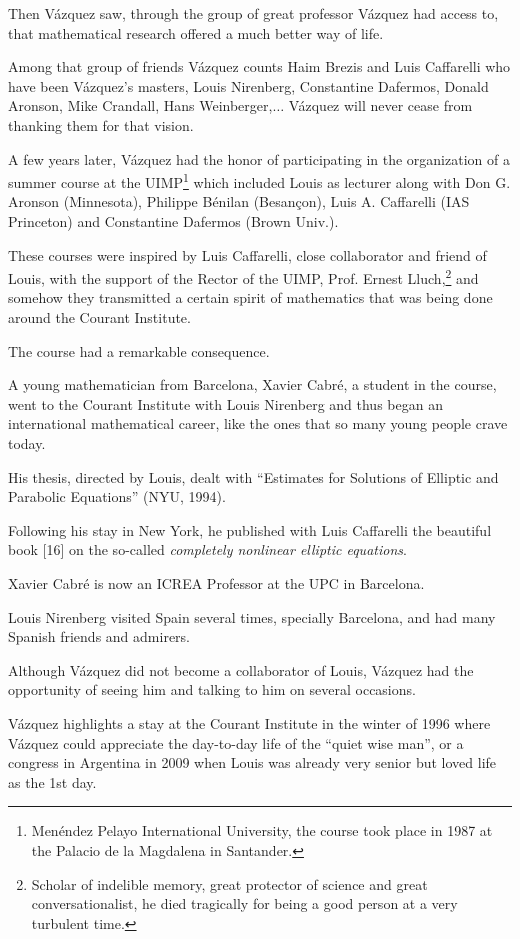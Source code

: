 \documentclass{article}
\begin{document}
Then V\'azquez saw, through the group of great professor V\'azquez had access to, that mathematical research offered a much better way of life.

Among that group of friends V\'azquez counts Haim Brezis and Luis Caffarelli who have been V\'azquez's masters, Louis Nirenberg, Constantine Dafermos, Donald Aronson, Mike Crandall, Hans Weinberger,$\ldots$ V\'azquez will never cease from thanking them for that vision.

%
A few years later, V\'azquez had the honor of participating in the organization of a summer course at the UIMP\footnote{Men\'endez Pelayo International University, the course took place in 1987 at the Palacio de la Magdalena in Santander.} which included Louis as lecturer along with Don G. Aronson (Minnesota), Philippe Bénilan (Besançon), Luis A. Caffarelli (IAS Princeton) and Constantine Dafermos (Brown Univ.).

These courses were inspired by Luis Caffarelli, close collaborator and friend of Louis, with the support of the Rector of the UIMP, Prof. Ernest Lluch,\footnote{Scholar of indelible memory, great protector of science and great conversationalist, he died tragically for being a good person at a very turbulent time.} and somehow they transmitted a certain spirit of mathematics that was being done around the Courant Institute.

The course had a remarkable consequence.

A young mathematician from Barcelona, Xavier Cabr\'e, a student in the course, went to the Courant Institute with Louis Nirenberg and thus began an international mathematical career, like the ones that so many young people crave today.

His thesis, directed by Louis, dealt with ``Estimates for Solutions of Elliptic and Parabolic Equations'' (NYU, 1994).

Following his stay in New York, he published with Luis Caffarelli the beautiful book [16] on the so-called \textit{completely nonlinear elliptic equations}.

Xavier Cabr\'e is now an ICREA Professor at the UPC in Barcelona.

Louis Nirenberg visited Spain several times, specially Barcelona, and had many Spanish friends and admirers.

%
Although V\'azquez did not become a collaborator of Louis, V\'azquez had the opportunity of seeing him and talking to him on several occasions.

V\'azquez highlights a stay at the Courant Institute in the winter of 1996 where V\'azquez could appreciate the day-to-day life of the ``quiet wise man'', or a congress in Argentina in 2009 when Louis was already very senior but loved life as the 1st day.
\end{document}
